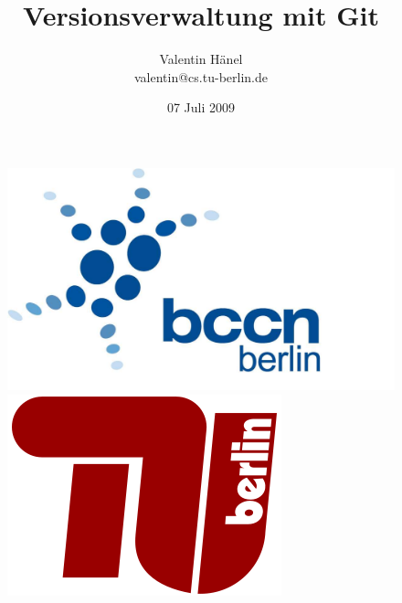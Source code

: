 \documentclass[ hyperref={colorlinks=true,filecolor=blue,linkcolor=blue,urlcolor=blue}]{beamer}
\author{Valentin H\"anel\\
        valentin@cs.tu-berlin.de}
\institute{Technische Universität Berlin \\
Bernstein Center for Computational Neuroscience Berlin}
\title{Versionsverwaltung mit Git }
\date{07 Juli 2009}
\begin{document}
\begin{frame}
	\titlepage
    \begin{figure}
	    \includegraphics[scale=0.05]{BCCN_logo_berlin.pdf}
	    \includegraphics[scale=0.14]{tu_logo.png}
    \end{figure}
\end{frame}


\end{document}
